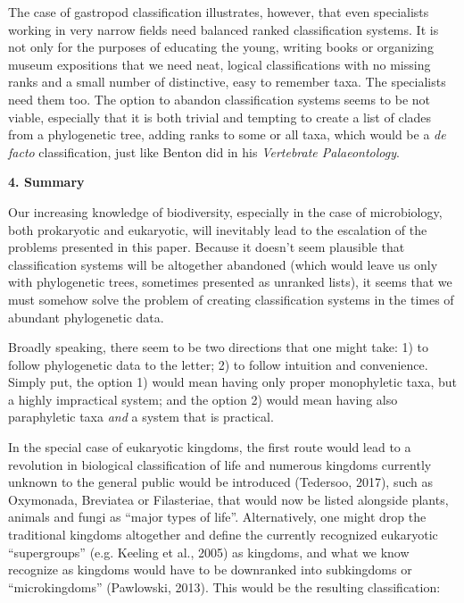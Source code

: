 \documentclass[a4paper]{article}
\begin{document}
The case of gastropod classification illustrates, however, that even specialists working in very narrow fields need
balanced ranked classification systems. It is not only for the purposes of educating the young, writing books or
organizing museum expositions that we need neat, logical classifications with no missing ranks and a small number of
distinctive, easy to remember taxa. The specialists need them too. The option to abandon classification systems seems
to be not viable, especially that it is both trivial and tempting to create a list of clades from a phylogenetic tree,
adding ranks to some or all taxa, which would be a \textit{de facto} classification, just like Benton did in his
\textit{Vertebrate Palaeontology}.

{\bfseries
4. Summary}

Our increasing knowledge of biodiversity, especially in the case of microbiology, both prokaryotic and eukaryotic, will
inevitably lead to the escalation of the problems presented in this paper. Because it doesn’t seem plausible that
classification systems will be altogether abandoned (which would leave us only with phylogenetic trees, sometimes
presented as unranked lists), it seems that we must somehow solve the problem of creating classification systems in the
times of abundant phylogenetic data.

Broadly speaking, there seem to be two directions that one might take: 1) to follow phylogenetic data to the letter; 2)
to follow intuition and convenience. Simply put, the option 1) would mean having only proper monophyletic taxa, but a
highly impractical system; and the option 2) would mean having also paraphyletic taxa \textit{and} a system that is
practical.

In the special case of eukaryotic kingdoms, the first route would lead to a revolution in biological classification of
life and numerous kingdoms currently unknown to the general public would be introduced
\label{ref:RND3uML7k6B2X}(Tedersoo, 2017), such as Oxymonada, Breviatea or Filasteriae, that would now be listed
alongside plants, animals and fungi as “major types of life”. Alternatively, one might drop the traditional kingdoms
altogether and define the currently recognized eukaryotic “supergroups” \label{ref:RNDsc7VI9vP7w}(e.g. Keeling et al.,
2005) as kingdoms, and what we know recognize as kingdoms would have to be downranked into subkingdoms or
“microkingdoms” \label{ref:RNDAlF3xlGnxL}(Pawlowski, 2013). This would be the resulting classification:
\end{document}
